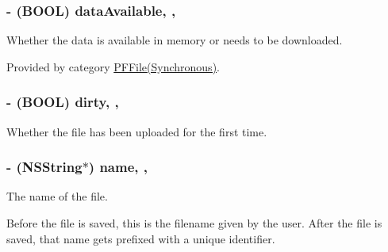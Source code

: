 \subsubsection[{data\+Available}]{\setlength{\rightskip}{0pt plus 5cm}-\/ (B\+O\+O\+L) data\+Available\hspace{0.3cm}{\ttfamily [read]}, {\ttfamily [nonatomic]}, {\ttfamily [assign]}}\label{interface_p_f_file_a5738638cfa60a28a222a0b4e8f97bd3e}




 





Whether the data is available in memory or needs to be downloaded. 

Provided by category \hyperlink{category_p_f_file_07_synchronous_08_aa67b26133772a9317623828eb5f4d349}{P\+F\+File(\+Synchronous)}.

\hypertarget{interface_p_f_file_a9ec0167c927ebbfd2dba1cec2fd114fb}{}
\subsubsection[{dirty}]{\setlength{\rightskip}{0pt plus 5cm}-\/ (B\+O\+O\+L) dirty\hspace{0.3cm}{\ttfamily [read]}, {\ttfamily [nonatomic]}, {\ttfamily [assign]}}\label{interface_p_f_file_a9ec0167c927ebbfd2dba1cec2fd114fb}
Whether the file has been uploaded for the first time. \hypertarget{interface_p_f_file_a7602815ca9a5e7628b2727ba7dd93b22}{}
\subsubsection[{name}]{\setlength{\rightskip}{0pt plus 5cm}-\/ (N\+S\+String$\ast$) name\hspace{0.3cm}{\ttfamily [read]}, {\ttfamily [nonatomic]}, {\ttfamily [copy]}}\label{interface_p_f_file_a7602815ca9a5e7628b2727ba7dd93b22}




 





The name of the file.

Before the file is saved, this is the filename given by the user. After the file is saved, that name gets prefixed with a unique identifier. \hypertarget{interface_p_f_file_ada906196949937fe800cc0cab2bc10e4}{}
